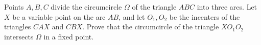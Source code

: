Points $A, B, C$ divide the circumcircle $\Omega$ of the triangle $ABC$ into three arcs. Let $X$ be a variable point on the arc $AB$, and let $O_1, O_2$ be the incenters of the triangles $CAX$ and $CBX$. Prove that the circumcircle of the triangle $XO_1O_2$ intersects $\Omega$ in a fixed point.
